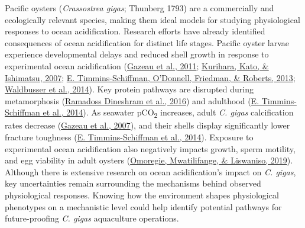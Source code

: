 \documentclass [11pt, proquest] {uwthesis}[2015/03/03]
\begin{document}
Pacific oysters (\emph{Crassostrea gigas}; Thunberg 1793) are a commercially and ecologically relevant species, making them ideal models for studying physiological responses to ocean acidification. Research efforts have already identified consequences of ocean acidification for distinct life stages. Pacific oyster larvae experience developmental delays and reduced shell growth in response to experimental ocean acidification (\protect\hyperlink{ref-Gazeau2011}{Gazeau et al., 2011}; \protect\hyperlink{ref-Kurihara2007}{Kurihara, Kato, \& Ishimatsu, 2007}; \protect\hyperlink{ref-Timmins-Schiffman2013}{E. Timmins-Schiffman, O'Donnell, Friedman, \& Roberts, 2013}; \protect\hyperlink{ref-Waldbusser2014}{Waldbusser et al., 2014}). Key protein pathways are disrupted during metamorphosis (\protect\hyperlink{ref-Dineshram2016}{Ramadoss Dineshram et al., 2016}) and adulthood (\protect\hyperlink{ref-Timmins-Schiffman2014}{E. Timmins-Schiffman et al., 2014}). As seawater pCO\textsubscript{2} increases, adult \emph{C. gigas} calcification rates decrease (\protect\hyperlink{ref-Gazeau2007}{Gazeau et al., 2007}), and their shells display significantly lower fracture toughness (\protect\hyperlink{ref-Timmins-Schiffman2014}{E. Timmins-Schiffman et al., 2014}). Exposure to experimental ocean acidification also negatively impacts growth, sperm motility, and egg viability in adult oysters (\protect\hyperlink{ref-Omoregie2019}{Omoregie, Mwatilifange, \& Liswaniso, 2019}). Although there is extensive research on ocean acidification's impact on \emph{C. gigas}, key uncertainties remain surrounding the mechanisms behind observed physiological responses. Knowing how the environment shapes physiological phenotypes on a mechanistic level could help identify potential pathways for future-proofing \emph{C. gigas} aquaculture operations.
\end{document}
